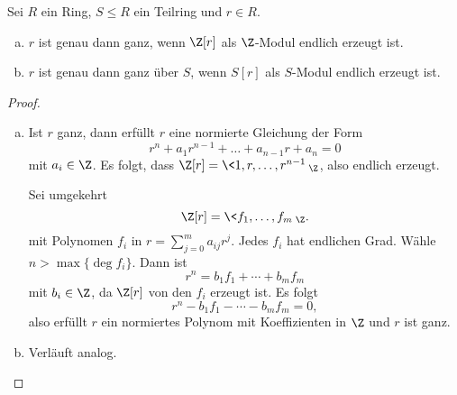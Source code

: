 \begin{lem} \label{5.1}
	Sei $R$ ein Ring, $S \le R$ ein Teilring und $r \in R$.
	\begin{enumerate}[a)]
		\item
			$r$ ist genau dann ganz, wenn $\Z[r]$ als $\Z$-Modul endlich erzeugt ist.
		\item
			$r$ ist genau dann ganz über $S$, wenn $S[r]$ als $S$-Modul endlich erzeugt ist.
	\end{enumerate}
	\begin{proof}
		\begin{enumerate}[a)]
			\item
				Ist $r$ ganz, dann erfüllt $r$ eine normierte Gleichung der Form
				\[
					r^n + a_1 r^{n-1} + \dotsc + a_{n-1} r + a_n = 0
				\]
				mit $a_i \in \Z$.
				Es folgt, dass $\Z[r] = \<1, r, \dotsc, r^{n-1}\>_\Z$, also endlich erzeugt.

				Sei umgekehrt
				\[
					\Z[r] = \< f_1, \dotsc, f_m \>_\Z.
				\]
				mit Polynomen $f_i$ in $r = \sum_{j=0}^m a_{ij} r^j$.
				Jedes $f_i$ hat endlichen Grad.
				Wähle $n > \max \{ \deg f_i \}$.
				Dann ist
				\[
					r^n = b_1 f_1 + \dotsb + b_m f_m
				\]
				mit $b_i \in \Z$, da $\Z[r]$ von den $f_i$ erzeugt ist.
				Es folgt
				\[
					r^n - b_1 f_1 - \dotsb - b_m f_m = 0,
				\]
				also erfüllt $r$ ein normiertes Polynom mit Koeffizienten in $\Z$ und $r$ ist ganz.
			\item
				Verläuft analog.
		\end{enumerate}
	\end{proof}
\end{lem}

